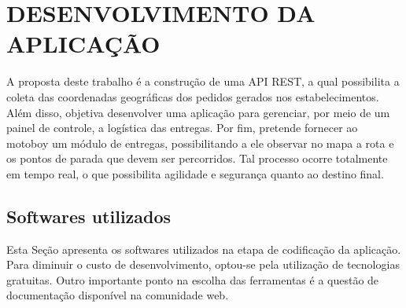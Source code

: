 
\chapter{DESENVOLVIMENTO DA APLICAÇÃO}
A proposta deste trabalho é a construção de uma API REST, a qual possibilita a coleta das coordenadas geográficas dos pedidos gerados nos estabelecimentos. Além disso, objetiva desenvolver uma aplicação para gerenciar, por meio de um painel de controle, a logística das entregas. Por fim, pretende fornecer ao motoboy um módulo de entregas, possibilitando a ele observar no mapa a rota e os pontos de parada que devem ser percorridos. Tal processo ocorre totalmente em tempo real, o que possibilita agilidade e segurança quanto ao destino final.

\section{Softwares utilizados}

Esta Seção apresenta os softwares utilizados na etapa de codificação da aplicação. Para diminuir o custo de desenvolvimento, optou-se pela utilização de tecnologias gratuitas. Outro importante ponto na escolha das ferramentas é a questão de documentação disponível na comunidade web.

